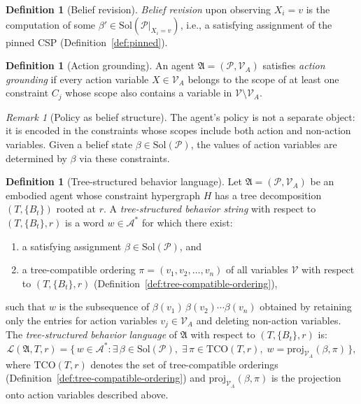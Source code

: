 \documentclass[11pt,a4paper]{article}
\theoremstyle{plain}
\theoremstyle{definition}
\newtheorem{definition}[theorem]{Definition}
\theoremstyle{remark}
\newtheorem{remark}[theorem]{Remark}
\begin{document}
\begin{definition}[Belief revision]\label{def:revision}
\emph{Belief revision} upon observing $X_i = v$ is the computation of some $\beta' \in \mathrm{Sol}(\mathcal{P}|_{X_i = v})$, i.e., a satisfying assignment of the pinned CSP (Definition~\ref{def:pinned}).
\end{definition}

\begin{definition}[Action grounding]\label{def:grounding}
An agent $\mathfrak{A} = (\mathcal{P}, \mathcal{V}_A)$ satisfies \emph{action grounding} if every action variable $X \in \mathcal{V}_A$ belongs to the scope of at least one constraint $C_j$ whose scope also contains a variable in $\mathcal{V} \setminus \mathcal{V}_A$.
\end{definition}

\begin{remark}[Policy as belief structure]\label{rem:policy}
The agent's policy is not a separate object: it is encoded in the constraints whose scopes include both action and non-action variables.
Given a belief state $\beta \in \mathrm{Sol}(\mathcal{P})$, the values of action variables are determined by $\beta$ via these constraints.
\end{remark}

\begin{definition}[Tree-structured behavior language]\label{def:behavior-language}
Let $\mathfrak{A} = (\mathcal{P}, \mathcal{V}_A)$ be an embodied agent whose constraint hypergraph $H$ has a tree decomposition $(T, \{B_t\})$ rooted at $r$.
A \emph{tree-structured behavior string} with respect to $(T, \{B_t\}, r)$ is a word $w \in \mathcal{A}^*$ for which there exist:
\begin{enumerate}[nosep,label=(\roman*)]
  \item a satisfying assignment $\beta \in \mathrm{Sol}(\mathcal{P})$, and
  \item a tree-compatible ordering $\pi = (v_1, v_2, \ldots, v_n)$ of all variables $\mathcal{V}$ with respect to $(T, \{B_t\}, r)$ (Definition~\ref{def:tree-compatible-ordering}),
\end{enumerate}
such that $w$ is the subsequence of $\beta(v_1)\, \beta(v_2) \cdots \beta(v_n)$ obtained by retaining only the entries for action variables $v_j \in \mathcal{V}_A$ and deleting non-action variables.
The \emph{tree-structured behavior language} of $\mathfrak{A}$ with respect to $(T, \{B_t\}, r)$ is:
\[
  \mathcal{L}(\mathfrak{A}, T, r) = \big\{\, w \in \mathcal{A}^* : \exists\, \beta \in \mathrm{Sol}(\mathcal{P}),\; \exists\, \pi \in \mathrm{TCO}(T, r),\; w = \mathrm{proj}_{\mathcal{V}_A}(\beta, \pi) \,\big\},
\]
where $\mathrm{TCO}(T,r)$ denotes the set of tree-compatible orderings (Definition~\ref{def:tree-compatible-ordering}) and $\mathrm{proj}_{\mathcal{V}_A}(\beta, \pi)$ is the projection onto action variables described above.
\end{definition}
\end{document}
